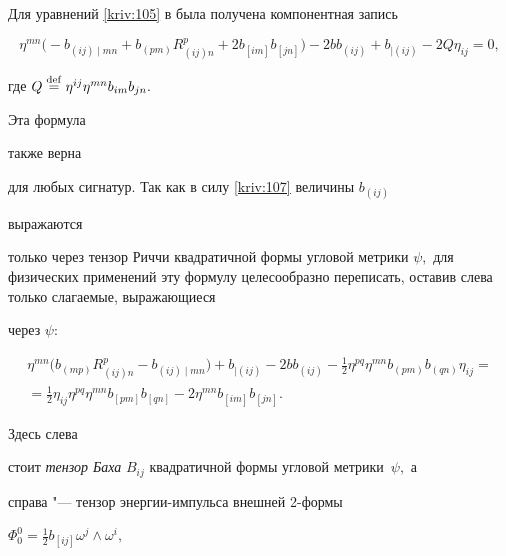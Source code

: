 Для уравнений \eqref{kriv:105} в \cite[стр. 444]{bib:kriv:2}  была получена компонентная запись

\begin{equation}

\eta ^{mn}\bigl( -b_{\left( ij\right) \mid mn}+b_{\left( pm\right)

}R_{\left( ij\right) n}^{p}+2b_{\left[ im\right] }b_{\left[ jn\right]

}\bigr) -2bb_{\left( ij\right) }+b_{\mid \left( ij\right) }-2Q\eta _{ij}=0,

\label{kriv:108}

\end{equation}

где $Q\overset{\rm def}{=}\eta ^{ij}\eta ^{mn}b_{im}b_{jn}.$ 

Эта формула 

также верна 

для любых сигнатур. Так как в силу \eqref{kriv:107} величины $b_{\left( ij\right) }$ 

выражаются 

только через тензор Риччи квадратичной формы угловой метрики $\psi ,$ для физических применений эту формулу целесообразно переписать, оставив слева только слагаемые, выражающиеся 

через $\psi $:

\begin{multline}

\eta ^{mn}\bigl( b_{\left( mp\right) }R_{(ij)n}^{p}-b_{\left( ij\right) \mid mn}\bigr) 

+b_{\mid \left( ij\right) }-2bb_{\left( ij\right) }-\frac{1}{2}\eta ^{pq}\eta ^{mn}b_{\left( pm\right) }b_{\left( qn\right) }\eta _{ij}= \\  

=\frac{1}{2}\eta _{ij}\eta ^{pq}\eta ^{mn}b_{\left[ pm\right] }b_{\left[ qn\right] }-2\eta ^{mn}b_{\left[ im\right] }b_{\left[ jn\right] }.

\label{kriv:109}

\end{multline}

Здесь слева 

стоит \textit{тензор Баха} $B_{ij}$ квадратичной формы угловой метрики~$\psi ,$ а 

справа "--- тензор энергии-импульса внешней 2-формы 

${\Phi

_{0}^{0}=\tfrac{1}{2}b_{\left[ ij\right] }\omega ^{j}\wedge \omega ^{i},}$ 

